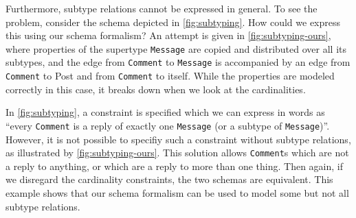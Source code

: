\documentclass{article}
\theoremstyle{definition}
\begin{document}


Furthermore, subtype relations cannot be expressed in general. To see the problem, consider the schema depicted in \autoref{fig:subtyping}. How could we express this using our schema formalism? An attempt is given in \autoref{fig:subtyping-ours}, where properties of the supertype \texttt{Message} are copied and distributed over all its subtypes, and the edge from \texttt{Comment} to \texttt{Message} is accompanied by an edge from \texttt{Comment} to Post and from \texttt{Comment} to itself. While the properties are modeled correctly in this case, it breaks down when we look at the cardinalities.

In \autoref{fig:subtyping}, a constraint is specified which we can express in words as ``every \texttt{Comment} is a reply of exactly one \texttt{Message} (or a subtype of \texttt{Message})''. However, it is not possible to specifiy such a constraint without subtype relations, as illustrated by \autoref{fig:subtyping-ours}. This solution allows \texttt{Comment}s which are not a reply to anything, or which are a reply to more than one thing. Then again, if we disregard the cardinality constraints, the two schemas are equivalent. This example shows that our schema formalism can be used to model some but not all subtype relations.
\end{document}
